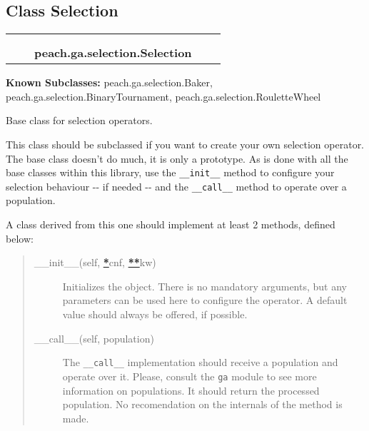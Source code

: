
\subsection{Class Selection}

    \label{peach:ga:selection:Selection}
\begin{tabular}{cccccc}
\multicolumn{2}{r}{\settowidth{\BCL}{object}\multirow{2}{\BCL}{object}}
&&
  \\\cline{3-3}
  &&\multicolumn{1}{c|}{}
&&
  \\
&&\multicolumn{2}{l}{\textbf{peach.ga.selection.Selection}}
\end{tabular}

\textbf{Known Subclasses:}
peach.ga.selection.Baker,
    peach.ga.selection.BinaryTournament,
    peach.ga.selection.RouletteWheel


Base class for selection operators.

This class should be subclassed if you want to create your own selection
operator. The base class doesn't do much, it is only a prototype. As is done
with all the base classes within this library, use the \texttt{\_\_init\_\_} method
to configure your selection behaviour -{}- if needed -{}- and the \texttt{\_\_call\_\_}
method to operate over a population.

A class derived from this one should implement at least 2 methods, defined
below:
%
\begin{quote}
%
\begin{description}
\item[{\_\_init\_\_(self, %
\hyperlink{id1}{\textbf{\color{red}*}}cnf, %
\hyperlink{id3}{\textbf{\color{red}**}}kw)}] \leavevmode 
Initializes the object. There is no mandatory arguments, but any
parameters can be used here to configure the operator. A default value
should always be offered, if possible.

\item[{\_\_call\_\_(self, population)}] \leavevmode 
The \texttt{\_\_call\_\_} implementation should receive a population and operate
over it. Please, consult the \texttt{ga} module to see more information on
populations. It should return the processed population. No recomendation
on the internals of the method is made.

\end{description}

\end{quote}

